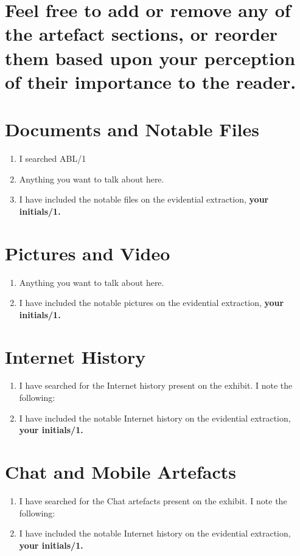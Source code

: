 \documentclass[11pt]{article}
\begin{document}
\section*{Feel free to add or remove any of the artefact sections, or reorder them based upon your perception of their importance to the reader.}

\section*{Documents and Notable Files}
\begin{enumerate}[resume]
    \item I searched ABL/1
    \item Anything you want to talk about here.
    \item I have included the notable files on the evidential extraction, \textbf{your initials/1.}
\end{enumerate}

\section*{Pictures and Video}
\begin{enumerate}[resume]
    \item Anything you want to talk about here.
    \item I have included the notable pictures on the evidential extraction, \textbf{your initials/1.}
\end{enumerate}

\section*{Internet History}
\begin{enumerate}[resume]
    \item I have searched for the Internet history present on the exhibit. I note the following:
    \item I have included the notable Internet history on the evidential extraction, \textbf{your initials/1.}
\end{enumerate}

\section*{Chat and Mobile Artefacts}
\begin{enumerate}[resume]
    \item I have searched for the Chat artefacts present on the exhibit. I note the following:
    \item I have included the notable Internet history on the evidential extraction, \textbf{your initials/1.}
\end{enumerate}
\end{document}
